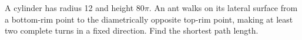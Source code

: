 A cylinder has radius 12 and height $80\pi$. An ant walks on its lateral surface from a bottom-rim point to the diametrically opposite top-rim point, making at least two complete turns in a fixed direction. Find the shortest path length.
